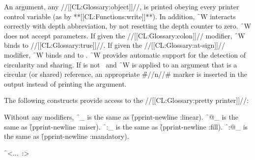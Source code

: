 An argument, any //[[CL:Glossary:object]]//, is printed obeying every printer control variable (as by **[[CL:Functions:write]]**).  In addition, \f{~W} interacts correctly with depth abbreviation, by not resetting the depth counter to zero.  \f{~W} does not accept parameters.  If given the //[[CL:Glossary:colon]]// modifier, \f{~W} binds  to //[[CL:Glossary:true]]//.  If given the //[[CL:Glossary:at-sign]]// modifier, \f{~W} binds  and  to \nil.
  \f{~W} provides automatic support for the detection of circularity and sharing.  If  is not \nil\ and \f{~W} is applied to an argument that is a circular (or shared) reference, an appropriate  \f{\#//n//\#} marker is inserted in the output instead of printing the argument.
  \endsubsubsection%

\endsubsection%



The following constructs provide access to the //[[CL:Glossary:pretty printer]]//:

  

Without any modifiers, \f{~_} is the same as \f{(pprint-newline :linear)}. \f{~@_}  is the same as \f{(pprint-newline :miser)}. \f{~:_}  is the same as \f{(pprint-newline :fill)}. \f{~:@_} is the same as \f{(pprint-newline :mandatory)}.

\endsubsubsection%

  

\f{~<...~:>}

